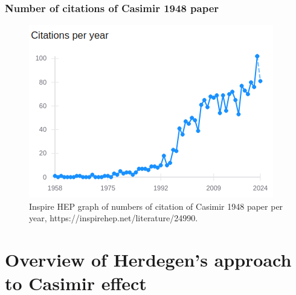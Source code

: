 \documentclass[10pt,t]{beamer}
\begin{document}
\begin{frame}
  \frametitle{Number of citations of Casimir 1948 paper}


  \begin{figure}

    \label{fig:Casimir-paper-citations}

    \centering


    \includegraphics[scale=0.6]
    {./Presentation-pictures/Casimir-paper-citations.png}

    \caption{Inspire HEP graph of numbers of citation of Casimir 1948 paper
      per year, 
      {https://inspirehep.net/literature/24990}.}


  \end{figure}

\end{frame}










\section{Overview of Herdegen's approach to Casimir effect}
\end{document}
